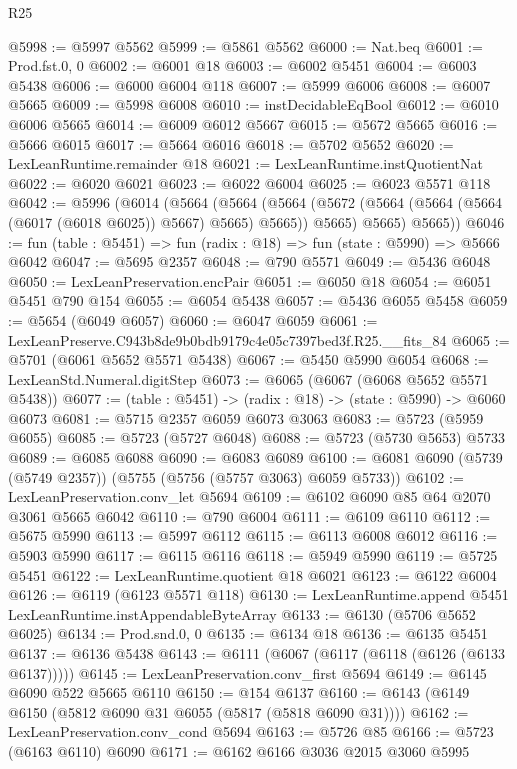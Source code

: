 \begin{lexlean}{R25}
\begin{coremodule}
@5998 := @5997 @5562
@5999 := @5861 @5562
@6000 := Nat.beq
@6001 := Prod.fst.{0, 0}
@6002 := @6001 @18
@6003 := @6002 @5451
@6004 := @6003 @5438
@6006 := @6000 @6004 @118
@6007 := @5999 @6006
@6008 := @6007 @5665
@6009 := @5998 @6008
@6010 := instDecidableEqBool
@6012 := @6010 @6006 @5665
@6014 := @6009 @6012 @5667
@6015 := @5672 @5665
@6016 := @5666 @6015
@6017 := @5664 @6016
@6018 := @5702 @5652
@6020 := LexLeanRuntime.remainder @18
@6021 := LexLeanRuntime.instQuotientNat
@6022 := @6020 @6021
@6023 := @6022 @6004
@6025 := @6023 @5571 @118
@6042 := @5996
    (@6014
      (@5664
        (@5664
          (@5664 (@5672 (@5664 (@5664 (@5664 (@6017 (@6018 @6025)) @5667) @5665) @5665)) @5665)
          @5665)
        @5665))
@6046 := fun (table : @5451) => fun (radix : @18) => fun (state : @5990) => @5666 @6042
@6047 := @5695 @2357
@6048 := @790 @5571
@6049 := @5436 @6048
@6050 := LexLeanPreservation.encPair
@6051 := @6050 @18
@6054 := @6051 @5451 @790 @154
@6055 := @6054 @5438
@6057 := @5436 @6055 @5458
@6059 := @5654 (@6049 @6057)
@6060 := @6047 @6059
@6061 := LexLeanPreserve.C943b8de9b0bdb9179c4e05c7397bed3f.R25.__fits_84
@6065 := @5701 (@6061 @5652 @5571 @5438)
@6067 := @5450 @5990 @6054
@6068 := LexLeanStd.Numeral.digitStep
@6073 := @6065 (@6067 (@6068 @5652 @5571 @5438))
@6077 := (table : @5451) -> (radix : @18) -> (state : @5990) -> @6060 @6073
@6081 := @5715 @2357 @6059 @6073 @3063
@6083 := @5723 (@5959 @6055)
@6085 := @5723 (@5727 @6048)
@6088 := @5723 (@5730 @5653) @5733
@6089 := @6085 @6088
@6090 := @6083 @6089
@6100 := @6081 @6090 (@5739 (@5749 @2357)) (@5755 (@5756 (@5757 @3063) @6059 @5733))
@6102 := LexLeanPreservation.conv_let @5694
@6109 := @6102 @6090 @85 @64 @2070 @3061 @5665 @6042
@6110 := @790 @6004
@6111 := @6109 @6110
@6112 := @5675 @5990
@6113 := @5997 @6112
@6115 := @6113 @6008 @6012
@6116 := @5903 @5990
@6117 := @6115 @6116
@6118 := @5949 @5990
@6119 := @5725 @5451
@6122 := LexLeanRuntime.quotient @18 @6021
@6123 := @6122 @6004
@6126 := @6119 (@6123 @5571 @118)
@6130 := LexLeanRuntime.append @5451 LexLeanRuntime.instAppendableByteArray
@6133 := @6130 (@5706 @5652 @6025)
@6134 := Prod.snd.{0, 0}
@6135 := @6134 @18
@6136 := @6135 @5451
@6137 := @6136 @5438
@6143 := @6111 (@6067 (@6117 (@6118 (@6126 (@6133 @6137)))))
@6145 := LexLeanPreservation.conv_first @5694
@6149 := @6145 @6090 @522 @5665 @6110
@6150 := @154 @6137
@6160 := @6143 (@6149 @6150 (@5812 @6090 @31 @6055 (@5817 (@5818 @6090 @31))))
@6162 := LexLeanPreservation.conv_cond @5694
@6163 := @5726 @85
@6166 := @5723 (@6163 @6110) @6090
@6171 := @6162 @6166 @3036 @2015 @3060 @5995

\end{coremodule}
\end{lexlean}
